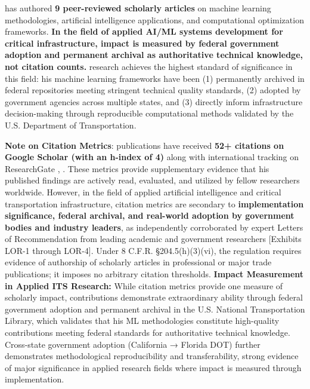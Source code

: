 

\dr has authored \textbf{9 peer-reviewed scholarly articles} on machine learning methodologies, artificial intelligence applications, and computational optimization frameworks. \textbf{In the field of applied AI/ML systems development for critical infrastructure, impact is measured by federal government adoption and permanent archival as authoritative technical knowledge, not citation counts.} \drs research achieves the highest standard of significance in this field: his machine learning frameworks have been (1) permanently archived in federal repositories meeting stringent technical quality standards, (2) adopted by government agencies across multiple states, and (3) directly inform infrastructure decision-making through reproducible computational methods validated by the U.S. Department of Transportation.

\textbf{Note on Citation Metrics}: \drs publications have received \textbf{52+ citations on Google Scholar (with an h-index of 4)} along with international tracking on ResearchGate \cite{SR11}, \cite{SR12}. These metrics provide supplementary evidence that his published findings are actively read, evaluated, and utilized by fellow researchers worldwide. However, in the field of applied artificial intelligence and critical transportation infrastructure, citation metrics are secondary to \textbf{implementation significance, federal archival, and real-world adoption by government bodies and industry leaders}, as independently corroborated by expert Letters of Recommendation from leading academic and government researchers [Exhibits LOR-1 through LOR-4]. Under 8 C.F.R. \S 204.5(h)(3)(vi), the regulation requires evidence of authorship of scholarly articles in professional or major trade publications; it imposes no arbitrary citation thresholds.
\textbf{Impact Measurement in Applied ITS Research:} While citation metrics provide one measure of scholarly impact, \drs contributions demonstrate extraordinary ability through federal government adoption and permanent archival in the U.S. National Transportation Library, which validates that his ML methodologies constitute high-quality contributions meeting federal standards for authoritative technical knowledge. Cross-state government adoption (California → Florida DOT) further demonstrates methodological reproducibility and transferability, strong evidence of major significance in applied research fields where impact is measured through implementation.


